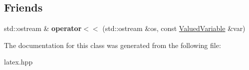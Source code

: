 \subsection*{Friends}
\begin{DoxyCompactItemize}
\item 
\hypertarget{classlatex_1_1math_1_1ValuedVariable_a1091332fb959f33e8cf6cb07273c508b}{std\-::ostream \& {\bfseries operator$<$$<$} (std\-::ostream \&os, const \hyperlink{classlatex_1_1math_1_1ValuedVariable}{Valued\-Variable} \&var)}\label{classlatex_1_1math_1_1ValuedVariable_a1091332fb959f33e8cf6cb07273c508b}

\end{DoxyCompactItemize}


The documentation for this class was generated from the following file\-:\begin{DoxyCompactItemize}
\item 
latex.\-hpp\end{DoxyCompactItemize}
